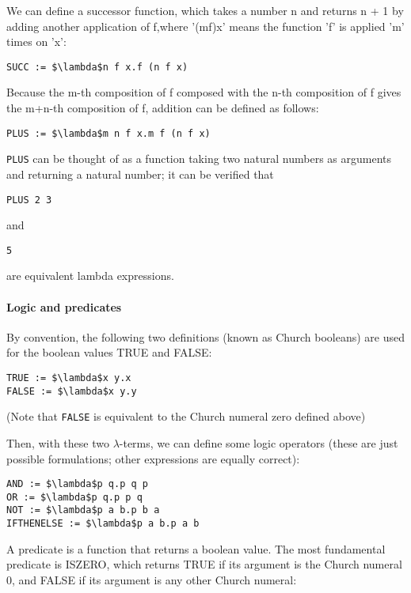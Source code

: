 \documentclass[12pt,b5paper]{book}
\theoremstyle{definition}
\begin{document}
We can define a successor function, which takes a number n and returns n + 1 by adding another application of f,where '(mf)x' means the function 'f' is applied 'm' times on 'x':

\begin{lstlisting}
SUCC := $\lambda$n f x.f (n f x)
\end{lstlisting}

Because the m-th composition of f composed with the n-th composition of f gives the m+n-th composition of f, addition can be defined as follows:

\begin{lstlisting}
PLUS := $\lambda$m n f x.m f (n f x)
\end{lstlisting}

\texttt{PLUS} can be thought of as a function taking two natural numbers as arguments and returning a natural number; it can be verified that

\begin{lstlisting}
PLUS 2 3
\end{lstlisting}

and

\begin{lstlisting}
5
\end{lstlisting}

are equivalent lambda expressions.

\paragraph{Logic and predicates}
By convention, the following two definitions (known as Church booleans) are used for the boolean values TRUE and FALSE:

\begin{lstlisting}
TRUE := $\lambda$x y.x
FALSE := $\lambda$x y.y 
\end{lstlisting}

(Note that \texttt{FALSE} is equivalent to the Church numeral zero defined above)

Then, with these two $\lambda$-terms, we can define some logic operators (these are just possible formulations; other expressions are equally correct):

\begin{lstlisting}
AND := $\lambda$p q.p q p
OR := $\lambda$p q.p p q
NOT := $\lambda$p a b.p b a
IFTHENELSE := $\lambda$p a b.p a b
\end{lstlisting}

A predicate is a function that returns a boolean value. The most fundamental predicate is ISZERO, which returns TRUE if its argument is the Church numeral 0, and FALSE if its argument is any other Church numeral:
\end{document}
